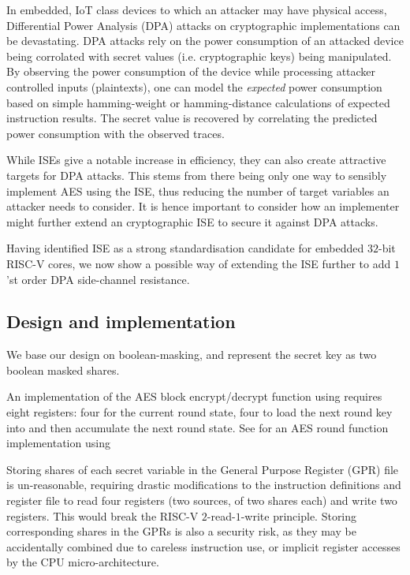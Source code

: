 
In embedded, IoT class devices to which an attacker may have
physical access,
Differential Power Analysis (DPA) attacks on cryptographic implementations
\cite{KJJ:99} can be devastating.
DPA attacks rely on the power consumption of an attacked device being
corrolated with secret values (i.e. cryptographic keys) being manipulated.
By observing the power consumption of the device while processing
attacker controlled inputs (plaintexts), one can model the {\em expected}
power consumption based on simple hamming-weight or hamming-distance
calculations of expected instruction results.
The secret value is recovered by correlating the predicted power
consumption with the observed traces.

While ISEs give a notable increase in efficiency, they can also create
attractive targets for DPA attacks.
This stems from there being only one way to sensibly implement
AES using the ISE, thus reducing the number of target variables an
attacker needs to consider.
It is hence important to consider how an implementer might
further extend an cryptographic ISE to secure it against DPA attacks.

Having identified ISE  as a strong standardisation candidate
for embedded $32$-bit RISC-V cores, we now show a possible
way of extending the ISE further to add 
$1$'st order DPA side-channel resistance.

\subsection{Design and implementation}

We base our design on boolean-masking, and represent the secret
key as two boolean masked shares.

An implementation of the AES block encrypt/decrypt function 
using  requires eight registers:
four for the current round state,
four to load the next round key into
and
then accumulate the next round state.
See  for an AES round function implementation
using 

Storing shares of each secret variable
in the General Purpose Register (GPR) file is un-reasonable,
requiring drastic modifications to the instruction definitions and
register file to read four registers (two sources, of two shares each) and
write two registers.
This would break the RISC-V $2$-read-$1$-write principle.
Storing corresponding shares in the GPRs is also a security
risk, as they may be accidentally combined due to
careless instruction use, or implicit register accesses by the
CPU micro-architecture.

